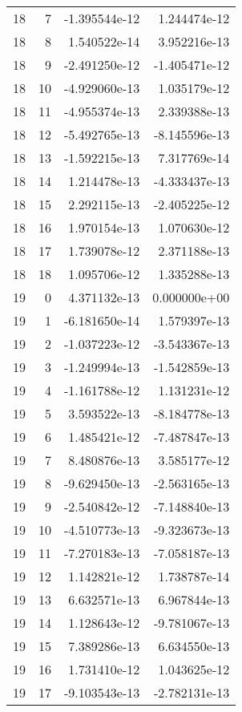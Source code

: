 \begin{tabular}{rrrr}
  18 &    7 & -1.395544e-12 &  1.244474e-12 \\
  18 &    8 &  1.540522e-14 &  3.952216e-13 \\
  18 &    9 & -2.491250e-12 & -1.405471e-12 \\
  18 &   10 & -4.929060e-13 &  1.035179e-12 \\
  18 &   11 & -4.955374e-13 &  2.339388e-13 \\
  18 &   12 & -5.492765e-13 & -8.145596e-13 \\
  18 &   13 & -1.592215e-13 &  7.317769e-14 \\
  18 &   14 &  1.214478e-13 & -4.333437e-13 \\
  18 &   15 &  2.292115e-13 & -2.405225e-12 \\
  18 &   16 &  1.970154e-13 &  1.070630e-12 \\
  18 &   17 &  1.739078e-12 &  2.371188e-13 \\
  18 &   18 &  1.095706e-12 &  1.335288e-13 \\
  19 &    0 &  4.371132e-13 &  0.000000e+00 \\
  19 &    1 & -6.181650e-14 &  1.579397e-13 \\
  19 &    2 & -1.037223e-12 & -3.543367e-13 \\
  19 &    3 & -1.249994e-13 & -1.542859e-13 \\
  19 &    4 & -1.161788e-12 &  1.131231e-12 \\
  19 &    5 &  3.593522e-13 & -8.184778e-13 \\
  19 &    6 &  1.485421e-12 & -7.487847e-13 \\
  19 &    7 &  8.480876e-13 &  3.585177e-12 \\
  19 &    8 & -9.629450e-13 & -2.563165e-13 \\
  19 &    9 & -2.540842e-12 & -7.148840e-13 \\
  19 &   10 & -4.510773e-13 & -9.323673e-13 \\
  19 &   11 & -7.270183e-13 & -7.058187e-13 \\
  19 &   12 &  1.142821e-12 &  1.738787e-14 \\
  19 &   13 &  6.632571e-13 &  6.967844e-13 \\
  19 &   14 &  1.128643e-12 & -9.781067e-13 \\
  19 &   15 &  7.389286e-13 &  6.634550e-13 \\
  19 &   16 &  1.731410e-12 &  1.043625e-12 \\
  19 &   17 & -9.103543e-13 & -2.782131e-13 \\

\end{tabular}
